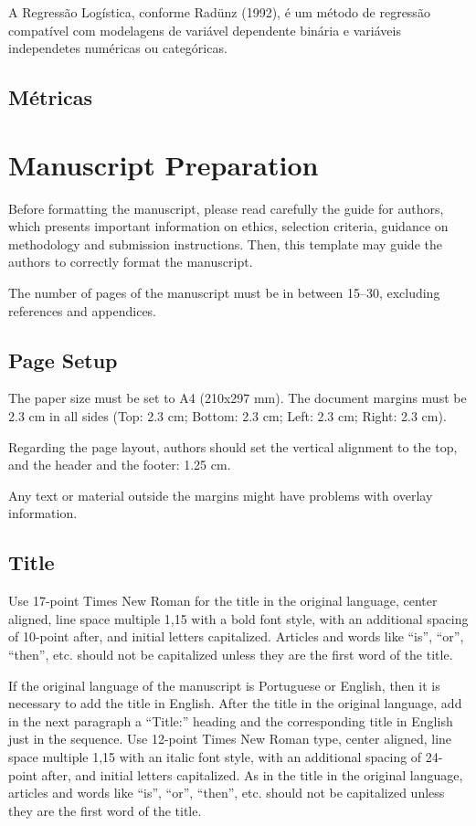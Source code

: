 \documentclass[english, spanish, brazilian]{RBIEarticle} %
\begin{document}
A Regressão Logística, conforme Radünz (1992), é um método de regressão compatível com modelagens de variável dependente binária e variáveis independetes numéricas ou categóricas. 

\subsection{Métricas}


\section{Manuscript Preparation}
Before formatting the manuscript, please read carefully the guide for authors, which presents important information on ethics, selection criteria, guidance on methodology and submission instructions. Then, this template may guide the authors to correctly format the manuscript.

The number of pages of the manuscript must be in between 15--30, excluding references and appendices.


\subsection{Page Setup}
The paper size must be set to A4 (210x297 mm). The document margins must be 2.3 cm in all sides (Top: 2.3 cm; Bottom: 2.3 cm; Left: 2.3 cm; Right: 2.3 cm).

Regarding the page layout, authors should set the vertical alignment to the top, and the header and the footer: 1.25 cm.

Any text or material outside the margins might have problems with overlay information.


\subsection{Title}
Use 17-point Times New Roman for the title in the original language, center aligned, line space multiple 1,15 with a bold font style, with an additional spacing of 10-point after, and initial letters capitalized. Articles and words like ``is'', ``or'', ``then'', etc. should not be capitalized unless they are the first word of the title.

If the original language of the manuscript is Portuguese or English, then it is necessary to add the title in English. After the title in the original language, add in the next paragraph a “Title:” heading and the corresponding title in English just in the sequence. Use 12-point Times New Roman type, center aligned, line space multiple 1,15 with an italic font style, with an additional spacing of 24-point after, and initial letters capitalized. As in the title in the original language, articles and words like ``is'', ``or'', ``then'', etc. should not be capitalized unless they are the first word of the title.
\end{document}
